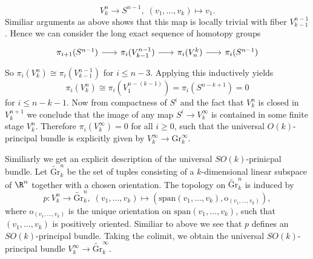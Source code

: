 \begin{example}
\begin{enumerate}[label=(\roman*)]
        \[
        V_k^n \to S^{n-1}, \; (v_1, \ldots, v_k) \mapsto v_1.
        \]
        Similiar arguments as above shows that this map is locally trivial with fiber $V_{k-1}^{n-1}$. Hence we can consider the long exact sequence of homotopy groups 
        \[\begin{tikzcd}[column sep=scriptsize]
        {\pi_{i+1}(S^{n-1})} & {\pi_i(V_{k-1}^{n-1})} & {\pi_i(V_n^k)} & {\pi_i(S^{n-1})}
        \arrow[from=1-1, to=1-2]
        \arrow[from=1-2, to=1-3]
        \arrow[from=1-3, to=1-4]
        \end{tikzcd}\]
        So $\pi_i(V_k^n) \cong \pi_i(V_{k-1}^{n-1})$ for $i \leq n-3$. Applying this inductively yields 
        \[
        \pi_i(V_k^n) \cong \pi_i(V_1^{n-(k-1)}) = \pi_i(S^{n-k+1}) = 0
        \] 
        for $i \leq n-k-1$. Now from compactness of $S^i$ and the fact that $V_k^n$ is closed in $V_k^{n+1}$ we conclude that the image of any map $S^i \to V_k^\infty$ is contained in some finite stage $V_k^n$. Therefore $\pi_i(V_k^\infty) = 0$ for all $i \geq 0$, such that the universal $O(k)$-principal bundle is explicitly given by $V_k^\infty \to \mathrm{Gr}_k^\infty$.

        Similiarly we get an explicit description of the universal $SO(k)$-prinicpal bundle. Let $\tilde{\mathrm{Gr}}_k^n$ be the set of tuples consisting of a $k$-dimensional linear subspace of $\R^n$ together with a chosen orientation. The topology on $\tilde{\mathrm{Gr}}_k^n$ is induced by 
        \[
        p \colon V_k^n \to \tilde{\mathrm{Gr}}_k^n, \; (v_1,\ldots,v_k) \mapsto (\mathrm{span}(v_1,\ldots,v_k), \mathrm{o}_{(v_1,\ldots,v_k)}),
        \] 
        where $\mathrm{o}_{(v_1,\ldots,v_k)}$ is the unique orientation on $\mathrm{span}(v_1,\ldots,v_k)$, such that $(v_1,\ldots,v_k)$ is positively oriented. Similiar to above we see that $p$ defines an $SO(k)$-principal bundle. Taking the colimit, we obtain the universal $SO(k)$-principal bundle $V_k^\infty \to \tilde{\mathrm{Gr}}_k^\infty$.


\end{enumerate}
\end{example}
